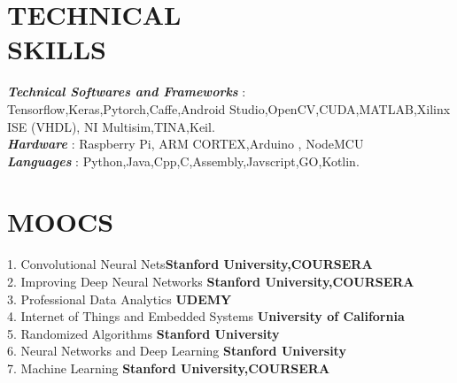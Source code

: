 \documentclass[margin]{res}
\begin{document}
\begin{resume}
\section{TECHNICAL \\ SKILLS}
\textsl{\textbf{Technical Softwares and Frameworks}} \hspace{9pt}: Tensorflow,Keras,Pytorch,Caffe,Android Studio,OpenCV,CUDA,MATLAB,Xilinx ISE (VHDL), NI Multisim,TINA,Keil.\\
\textsl{\textbf{Hardware}}  \hspace{55pt} : Raspberry Pi, ARM CORTEX,Arduino , NodeMCU\\
\textsl{\textbf{Languages}} \hspace{55pt}: Python,Java,Cpp,C,Assembly,Javscript,GO,Kotlin.




\section{MOOCS \\}
1. Convolutional Neural Nets\hfill \textbf{Stanford University,COURSERA}\\
2. Improving Deep Neural Networks  \hfill \textbf{Stanford University,COURSERA}\\
3. Professional Data Analytics \hfill \textbf{UDEMY}\\
4. Internet of Things and Embedded Systems \hfill \textbf{University of California}\\
5. Randomized Algorithms \hfill \textbf{Stanford University}\\
6. Neural Networks and Deep Learning
 \hfill \textbf{Stanford University}\\
7. Machine Learning \hfill \textbf{Stanford University,COURSERA}\\




\end{resume}
\end{document}
